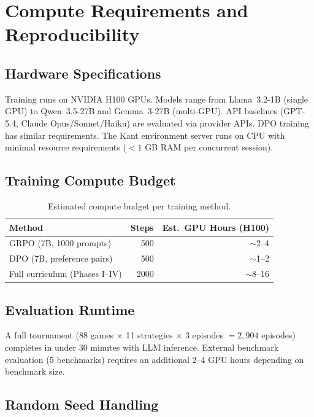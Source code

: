 
\section{Compute Requirements and Reproducibility}
\label{app:reproducibility}

\subsection{Hardware Specifications}

Training runs on NVIDIA H100 GPUs. Models range from Llama~3.2-1B (single
GPU) to Qwen~3.5-27B and Gemma~3-27B (multi-GPU). API baselines (GPT-5.4,
Claude Opus/Sonnet/Haiku) are evaluated via provider APIs. DPO training has similar
requirements. The Kant environment server runs on CPU with minimal
resource requirements ($<1$ GB RAM per concurrent session).

\subsection{Training Compute Budget}

\begin{table}[h]
\centering\small
\caption{Estimated compute budget per training method.}
\begin{tabular}{@{}lrr@{}}
\toprule
\textbf{Method} & \textbf{Steps} & \textbf{Est.\ GPU Hours (H100)} \\
\midrule
GRPO (7B, 1000 prompts) & 500 & $\sim$2--4 \\
DPO (7B, preference pairs) & 500 & $\sim$1--2 \\
Full curriculum (Phases I--IV) & 2000 & $\sim$8--16 \\
\bottomrule
\end{tabular}
\end{table}

\subsection{Evaluation Runtime}

A full tournament (88 games $\times$ 11 strategies $\times$ 3 episodes
$= 2{,}904$ episodes) completes in under 30 minutes with LLM inference.
External benchmark evaluation (5 benchmarks) requires an additional
2--4 GPU hours depending on benchmark size.

\subsection{Random Seed Handling}

